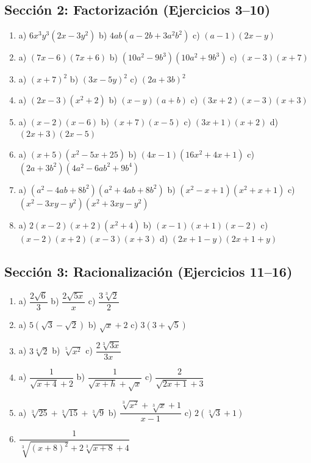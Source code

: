 \documentclass[12pt, letterpaper]{article}
\begin{document}
      \subsection*{Sección 2: Factorización (Ejercicios 3--10)}
      \begin{enumerate}[resume=respuestas, leftmargin=*, label=\textbf{\arabic*.}]
            \item a) $6x^3 y^3(2x - 3y^2)$ \quad b) $4ab(a - 2b + 3a^2 b^2)$ \quad c) $(a - 1)(2x - y)$
            \item a) $(7x - 6)(7x + 6)$ \quad b) $(10a^2 - 9b^3)(10a^2 + 9b^3)$ \quad c) $(x - 3)(x + 7)$
            \item a) $(x + 7)^2$ \quad b) $(3x - 5y)^2$ \quad c) $(2a + 3b)^2$
            \item a) $(2x - 3)(x^2 + 2)$ \quad b) $(x - y)(a + b)$ \quad c) $(3x + 2)(x - 3)(x + 3)$
            \item a) $(x - 2)(x - 6)$ \quad b) $(x + 7)(x - 5)$ \quad c) $(3x + 1)(x + 2)$ \quad d) $(2x + 3)(2x - 5)$
            \item a) $(x + 5)(x^2 - 5x + 25)$ \quad b) $(4x - 1)(16x^2 + 4x + 1)$ \quad c) $(2a + 3b^2)(4a^2 - 6ab^2 + 9b^4)$
            \item a) $(a^2 - 4ab + 8b^2)(a^2 + 4ab + 8b^2)$ \quad b) $(x^2 - x + 1)(x^2 + x + 1)$ \quad c) $(x^2 - 3xy - y^2)(x^2 + 3xy - y^2)$
            \item a) $2(x - 2)(x + 2)(x^2 + 4)$ \quad b) $(x - 1)(x + 1)(x - 2)$ \quad c) $(x - 2)(x + 2)(x - 3)(x + 3)$ \quad d) $(2x + 1 - y)(2x + 1 + y)$
      \end{enumerate}


      \subsection*{Sección 3: Racionalización (Ejercicios 11--16)}
      \begin{enumerate}[resume=respuestas, leftmargin=*, label=\textbf{\arabic*.}]
            \item a) $\dfrac{2\sqrt{6}}{3}$ \quad b) $\dfrac{2\sqrt{5x}}{x}$ \quad c) $\dfrac{3\sqrt[3]{2}}{2}$
            \item a) $5(\sqrt{3} - \sqrt{2})$ \quad b) $\sqrt{x} + 2$ \quad c) $3(3 + \sqrt{5})$
            \item a) $3\sqrt[4]{2}$ \quad b) $\sqrt[5]{x^2}$ \quad c) $\dfrac{2\sqrt[3]{3x}}{3x}$
            \item a) $\dfrac{1}{\sqrt{x + 4} + 2}$ \quad b) $\dfrac{1}{\sqrt{x + h} + \sqrt{x}}$ \quad c) $\dfrac{2}{\sqrt{2x + 1} + 3}$
            \item a) $\sqrt[3]{25} + \sqrt[3]{15} + \sqrt[3]{9}$ \quad b) $\dfrac{\sqrt[3]{x^2} + \sqrt[3]{x} + 1}{x - 1}$ \quad c) $2(\sqrt[3]{3} + 1)$
            \item $\dfrac{1}{\sqrt[3]{(x + 8)^2} + 2\sqrt[3]{x + 8} + 4}$
      \end{enumerate}
\end{document}
